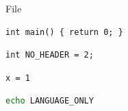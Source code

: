 \documentclass[aspectratio=169,10pt]{beamer}
\begin{document}
\begin{frame}[fragile]{File}
	\begin{minipage}[t]{0.45\linewidth}
		\begin{lstlisting}[file=src/flight_software/algorithm_core/directory/WRAPPED_PATH_entry_point.cpp]
int main() { return 0; }
		\end{lstlisting}
		\begin{lstlisting}
int NO_HEADER = 2;
		\end{lstlisting}
	\end{minipage}\hfill
	\begin{minipage}[t]{0.45\linewidth}
		\begin{lstlisting}[file=src/SHORT_PATH.py]
x = 1
		\end{lstlisting}
		\begin{lstlisting}[language=bash]
echo LANGUAGE_ONLY
		\end{lstlisting}
	\end{minipage}
\end{frame}
\end{document}
